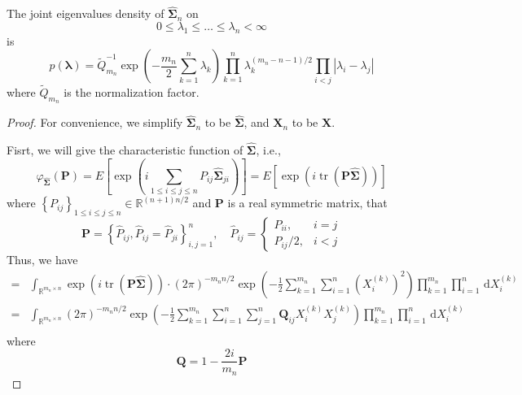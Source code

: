\begin{theorem}
    The joint eigenvalues density of $\widehat{\boldsymbol{\Sigma}}_{n}$ on
    \begin{equation*}
        0\leq\lambda_{1}\leq\ldots\leq\lambda_{n}<\infty
    \end{equation*}
    is
    \begin{equation}
        p\left(\boldsymbol{\lambda}\right)=\widetilde{Q}_{m_{n}}^{-1}\exp\left(-\frac{m_{n}}{2}\sum_{k=1}^{n}\lambda_{k}\right)\prod_{k=1}^{n}\lambda_{k}^{(m_{n}-n-1)/2}\prod_{i<j}\left|\lambda_{i}-\lambda_{j}\right|
        \label{eq:joint-pdf-eigenvalues-sigma_n}
    \end{equation}
    where $\widetilde{Q}_{m_{n}}$ is the normalization factor.
\end{theorem}
\begin{proof}
    For convenience, we simplify $\widehat{\boldsymbol{\Sigma}}_{n}$  to be $\widehat{\boldsymbol{\Sigma}}$, and $\mathbf{X}_{n}$ to be $\mathbf{X}$.

    Fisrt, we will give the characteristic function of $\widehat{\boldsymbol{\Sigma}}$, i.e.,
    \begin{equation*}
        \varphi_{\widehat{\boldsymbol{\Sigma}}}\left(\mathbf{P}\right)=E\left[\exp\left(i\sum_{1\leq i\leq j\leq n}P_{ij}\widehat{\boldsymbol{\Sigma}}_{ji}\right)\right]=E\left[\exp\left(i\operatorname{tr}\left(\mathbf{P}\widehat{\boldsymbol{\Sigma}}\right)\right)\right]
    \end{equation*}
    where $\left\{P_{ij}\right\}_{1\leq i\leq j\leq n}\in\mathbb{R}^{(n+1)n/2}$ and $\mathbf{P}$ is a real symmetric matrix, that
    \begin{equation*}
        \mathbf{P}=\left\{\widehat{P}_{ij},\widehat{P}_{ij}=\widehat{P}_{ji}\right\}_{i,j=1}^{n},\quad\widehat{P}_{ij}=\begin{cases}P_{ii}, & i=j \\ P_{ij} / 2, & i<j \end{cases}
    \end{equation*}
    Thus, we have
    \begin{equation*}
        \begin{aligned}
            = & \int_{\mathbb{R}^{m_{n}\times n}}\exp\left(i\operatorname{tr}\left(\mathbf{P}\widehat{\boldsymbol{\Sigma}}\right)\right)\cdot(2\pi)^{-m_{n}n/2}\exp\left(-\frac{1}{2}\sum_{k=1}^{m_{n}}\sum_{i=1}^{n}\left(X_{i}^{(k)}\right)^{2}\right)\prod_{k=1}^{m_{n}}\prod_{i=1}^{n}\,\mathrm{d}X_{i}^{(k)} \\
            = & \int_{\mathbb{R}^{m_{n}\times n}}(2\pi)^{-m_{n}n/2}\exp\left(-\frac{1}{2}\sum_{k=1}^{m_{n}}\sum_{i=1}^{n}\sum_{j=1}^{n}\mathbf{Q}_{ij}X_{i}^{(k)}X_{j}^{(k)}\right)\prod_{k=1}^{m_{n}}\prod_{i=1}^{n}\,\mathrm{d}X_{i}^{(k)}                                                                      \\
        \end{aligned}
    \end{equation*}
    where
    \begin{equation*}
        \mathbf{Q}=1-\frac{2i}{m_{n}}\mathbf{P}
    \end{equation*}


\end{proof}
